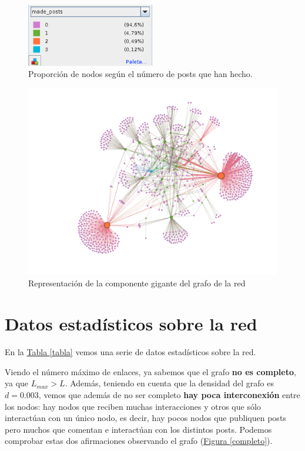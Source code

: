 \documentclass[10pt,a4paper,spanish]{article}
\numberwithin{equation}{section} %
\numberwithin{figure}{section} %
\numberwithin{table}{section} %
\begin{document}
\begin{figure}[!h]
    \centering
    \includegraphics[width=0.5\textwidth]{3}
    \caption{Proporción de nodos según el número de posts que han hecho.}
    \label{proporcion}
\end{figure}

\begin{figure}[!h]
    \centering
    \includegraphics[width=\textwidth]{2}
    \caption{Representación de la componente gigante del grafo de la red}
    \label{conexa}
\end{figure}

\section{Datos estadísticos sobre la red}

En la \hyperref[tabla]{Tabla \ref*{tabla}} vemos una serie de datos estadísticos sobre la red. 

Viendo el número máximo de enlaces, ya sabemos que el grafo \textbf{no es completo}, ya que $L_{max} > L$. Además, teniendo en cuenta que la densidad del grafo es $d = 0.003$, vemos que además de no ser completo \textbf{hay poca interconexión} entre los nodos: hay nodos que reciben muchas interacciones y otros que sólo interactúan con un único nodo, es decir, hay pocos nodos que publiquen posts pero muchos que comentan e interactúan con los distintos posts. Podemos comprobar estas dos afirmaciones observando el grafo (\hyperref[completo]{Figura \ref*{completo}}). 
\end{document}
